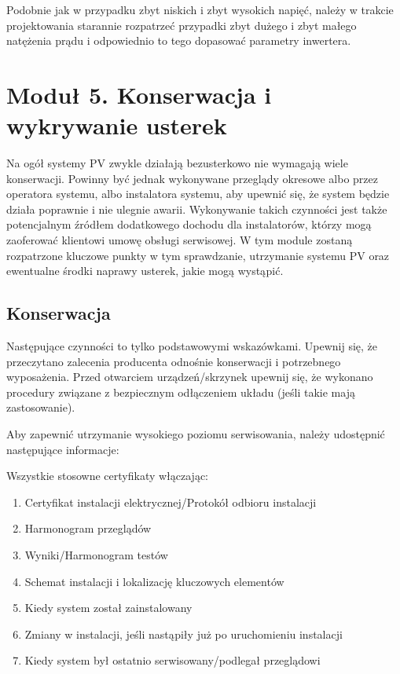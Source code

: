 \documentclass[12pt,a4paper]{article}
\begin{document}
 

Podobnie jak w przypadku zbyt niskich i zbyt wysokich napięć, należy w 
trakcie projektowania starannie rozpatrzeć przypadki zbyt dużego i zbyt 
małego natężenia prądu i odpowiednio to tego dopasować parametry 
inwertera. 

\section{Moduł 5. Konserwacja i wykrywanie usterek}
  

Na ogół systemy PV zwykle działają bezusterkowo nie wymagają wiele 
konserwacji. Powinny być jednak wykonywane przeglądy okresowe albo przez 
operatora systemu, albo instalatora systemu, aby upewnić się, że system 
będzie działa poprawnie i nie ulegnie awarii. Wykonywanie takich 
czynności jest także potencjalnym źródłem dodatkowego dochodu dla 
instalatorów, którzy mogą zaoferować klientowi umowę obsługi serwisowej. 
W tym module zostaną rozpatrzone kluczowe punkty w tym sprawdzanie, 
utrzymanie systemu PV oraz ewentualne środki naprawy usterek, jakie mogą 
wystąpić. 

 

\subsection{Konserwacja}


Następujące czynności to tylko podstawowymi wskazówkami. Upewnij się, że 
przeczytano zalecenia producenta odnośnie konserwacji i potrzebnego 
wyposażenia. Przed otwarciem urządzeń/skrzynek upewnij się, że wykonano 
procedury związane z bezpiecznym odłączeniem układu (jeśli takie mają 
zastosowanie). 

Aby zapewnić utrzymanie wysokiego poziomu serwisowania, należy 
udostępnić następujące informacje: 


Wszystkie stosowne certyfikaty włączając: 

\begin{enumerate}
\item Certyfikat instalacji elektrycznej/Protokół odbioru instalacji
\item Harmonogram przeglądów 
\item Wyniki/Harmonogram testów 
\item Schemat instalacji i lokalizację kluczowych elementów 
\item Kiedy system został zainstalowany 
\item Zmiany w instalacji, jeśli nastąpiły już po uruchomieniu 
instalacji 
\item Kiedy system był ostatnio serwisowany/podlegał przeglądowi 
\end{enumerate}
 
\end{document}
